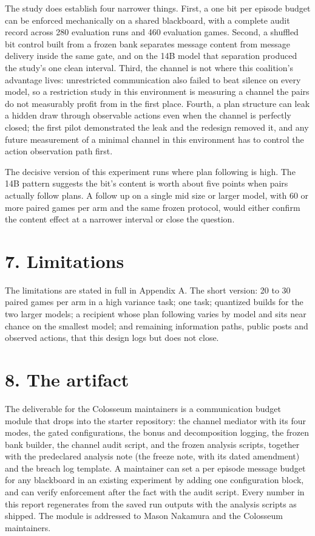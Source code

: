 \documentclass[11pt]{article}
\begin{document}
The study does establish four narrower things. First, a one bit per
episode budget can be enforced mechanically on a shared blackboard, with
a complete audit record across 280 evaluation runs and 460 evaluation
games. Second, a shuffled bit control built from a frozen bank separates
message content from message delivery inside the same gate, and on the
14B model that separation produced the study's one clean interval.
Third, the channel is not where this coalition's advantage lives:
unrestricted communication also failed to beat silence on every model,
so a restriction study in this environment is measuring a channel the
pairs do not measurably profit from in the first place. Fourth, a plan
structure can leak a hidden draw through observable actions even when
the channel is perfectly closed; the first pilot demonstrated the leak
and the redesign removed it, and any future measurement of a minimal
channel in this environment has to control the action observation path
first.

The decisive version of this experiment runs where plan following is
high. The 14B pattern suggests the bit's content is worth about five
points when pairs actually follow plans. A follow up on a single mid
size or larger model, with 60 or more paired games per arm and the same
frozen protocol, would either confirm the content effect at a narrower
interval or close the question.

\section{7. Limitations}\label{limitations}

The limitations are stated in full in Appendix A. The short version: 20
to 30 paired games per arm in a high variance task; one task; quantized
builds for the two larger models; a recipient whose plan following
varies by model and sits near chance on the smallest model; and
remaining information paths, public posts and observed actions, that
this design logs but does not close.

\section{8. The artifact}\label{the-artifact}

The deliverable for the Colosseum maintainers is a communication budget
module that drops into the starter repository: the channel mediator with
its four modes, the gated configurations, the bonus and decomposition
logging, the frozen bank builder, the channel audit script, and the
frozen analysis scripts, together with the predeclared analysis note
(the freeze note, with its dated amendment) and the breach log template.
A maintainer can set a per episode message budget for any blackboard in
an existing experiment by adding one configuration block, and can verify
enforcement after the fact with the audit script. Every number in this
report regenerates from the saved run outputs with the analysis scripts
as shipped. The module is addressed to Mason Nakamura and the Colosseum
maintainers.
\end{document}
